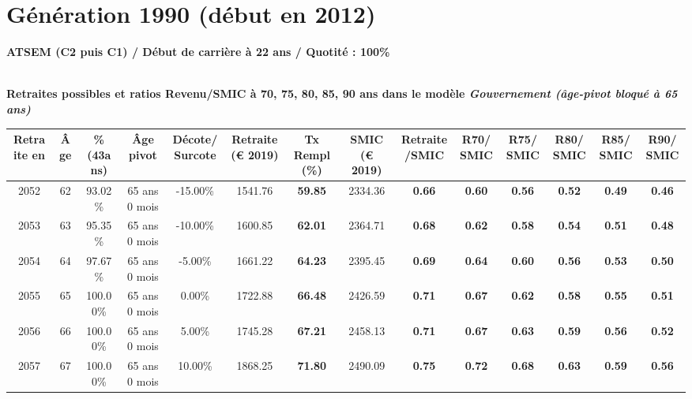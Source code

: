 \newpage 
 
\section{Génération 1990 (début en 2012)\label{ATSEM_100_1990_22_0}} 
 
{\bf \noindent ATSEM (C2 puis C1) / Début de carrière à 22 ans / Quotité : 100\%}  ~ 

 ~\\{\bf \noindent Retraites possibles et ratios Revenu/SMIC à 70, 75, 80, 85, 90 ans dans le modèle \emph{Gouvernement (âge-pivot bloqué à 65 ans)}}  
 
\begin{adjustbox}{max width=\textwidth} 
\begin{tabular}[htb]{|c|c||c|c|c||c|c||c|c||c|c|c|c|c|} 
\hline 
 Retraite en &  Âge &  \%(43ans) &  Âge pivot &  Décote/Surcote &  Retraite (\euro{} 2019) &  Tx Rempl(\%) &  SMIC (\euro{} 2019) &  Retraite/SMIC &  R70/SMIC &  R75/SMIC &  R80/SMIC &  R85/SMIC &  R90/SMIC \\ 
\hline \hline 
 2052 &  62 &  93.02\% &  65 ans 0 mois &  -15.00\% &  1541.76 &  {\bf 59.85} &  2334.36 &  {\bf {\color{red} 0.66}} &  {\bf {\color{red} 0.60}} &  {\bf {\color{red} 0.56}} &  {\bf {\color{red} 0.52}} &  {\bf {\color{red} 0.49}} &  {\bf {\color{red} 0.46}} \\ 
\hline 
 2053 &  63 &  95.35\% &  65 ans 0 mois &  -10.00\% &  1600.85 &  {\bf 62.01} &  2364.71 &  {\bf {\color{red} 0.68}} &  {\bf {\color{red} 0.62}} &  {\bf {\color{red} 0.58}} &  {\bf {\color{red} 0.54}} &  {\bf {\color{red} 0.51}} &  {\bf {\color{red} 0.48}} \\ 
\hline 
 2054 &  64 &  97.67\% &  65 ans 0 mois &  -5.00\% &  1661.22 &  {\bf 64.23} &  2395.45 &  {\bf {\color{red} 0.69}} &  {\bf {\color{red} 0.64}} &  {\bf {\color{red} 0.60}} &  {\bf {\color{red} 0.56}} &  {\bf {\color{red} 0.53}} &  {\bf {\color{red} 0.50}} \\ 
\hline 
 2055 &  65 &  100.00\% &  65 ans 0 mois &  0.00\% &  1722.88 &  {\bf 66.48} &  2426.59 &  {\bf {\color{red} 0.71}} &  {\bf {\color{red} 0.67}} &  {\bf {\color{red} 0.62}} &  {\bf {\color{red} 0.58}} &  {\bf {\color{red} 0.55}} &  {\bf {\color{red} 0.51}} \\ 
\hline 
 2056 &  66 &  100.00\% &  65 ans 0 mois &  5.00\% &  1745.28 &  {\bf 67.21} &  2458.13 &  {\bf {\color{red} 0.71}} &  {\bf {\color{red} 0.67}} &  {\bf {\color{red} 0.63}} &  {\bf {\color{red} 0.59}} &  {\bf {\color{red} 0.56}} &  {\bf {\color{red} 0.52}} \\ 
\hline 
 2057 &  67 &  100.00\% &  65 ans 0 mois &  10.00\% &  1868.25 &  {\bf 71.80} &  2490.09 &  {\bf {\color{red} 0.75}} &  {\bf {\color{red} 0.72}} &  {\bf {\color{red} 0.68}} &  {\bf {\color{red} 0.63}} &  {\bf {\color{red} 0.59}} &  {\bf {\color{red} 0.56}} \\ 
\hline 
\hline 
\end{tabular} 
\end{adjustbox} 
 
